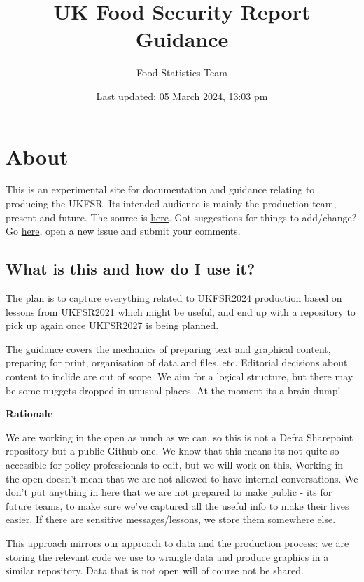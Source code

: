 \documentclass[
]{book}
\title{UK Food Security Report Guidance}
\author{Food Statistics Team}
\date{Last updated: 05 March 2024, 13:03 pm}
\begin{document}
\maketitle

{
\setcounter{tocdepth}{1}
\tableofcontents
}
\hypertarget{about}{%
\chapter{About}\label{about}}

This is an experimental site for documentation and guidance relating to
producing the UKFSR. Its intended audience is mainly the production team,
present and future. The source is
\href{https://github.com/FoodchainStats/ukfsr-docs}{here}. Got suggestions for things
to add/change? Go \href{https://github.com/FoodchainStats/ukfsr-docs/issues}{here},
open a new issue and submit your comments.

\hypertarget{what-is-this-and-how-do-i-use-it}{%
\section{What is this and how do I use it?}\label{what-is-this-and-how-do-i-use-it}}

The plan is to capture everything related to UKFSR2024 production based on
lessons from UKFSR2021 which might be useful, and end up with a repository to
pick up again once UKFSR2027 is being planned.

The guidance covers the mechanics of preparing text and graphical content,
preparing for print, organisation of data and files, etc. Editorial decisions
about content to inclide are out of scope. We aim for a logical structure, but
there may be some nuggets dropped in unusual places. At the moment its a brain
dump!

\textbf{Rationale}

We are working in the open as much as we can, so this is not a Defra Sharepoint
repository but a public Github one. We know that this means its not quite so
accessible for policy professionals to edit, but we will work on this. Working
in the open doesn't mean that we are not allowed to have internal conversations.
We don't put anything in here that we are not prepared to make public - its for
future teams, to make sure we've captured all the useful info to make their
lives easier. If there are sensitive messages/lessons, we store them somewhere
else.

This approach mirrors our approach to data and the production process: we are
storing the relevant code we use to wrangle data and produce graphics in a
similar repository. Data that is not open will of course not be shared.
\end{document}
